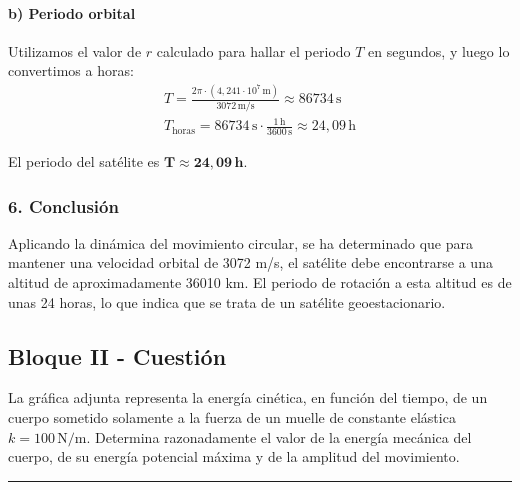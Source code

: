 \paragraph{b) Periodo orbital}
Utilizamos el valor de $r$ calculado para hallar el periodo $T$ en segundos, y luego lo convertimos a horas:
\begin{gather}
    T = \frac{2\pi \cdot (4,241 \cdot 10^7 \, \text{m})}{3072 \, \text{m/s}} \approx 86734 \, \text{s} \\
    T_{\text{horas}} = 86734 \, \text{s} \cdot \frac{1 \, \text{h}}{3600 \, \text{s}} \approx 24,09 \, \text{h}
\end{gather}
\begin{cajaresultado}
    El periodo del satélite es $\boldsymbol{T \approx 24,09 \, \textbf{h}}$.
\end{cajaresultado}

\subsubsection*{6. Conclusión}
\begin{cajaconclusion}
Aplicando la dinámica del movimiento circular, se ha determinado que para mantener una velocidad orbital de 3072 m/s, el satélite debe encontrarse a una altitud de aproximadamente 36010 km. El periodo de rotación a esta altitud es de unas 24 horas, lo que indica que se trata de un satélite geoestacionario.
\end{cajaconclusion}

\newpage
\subsection{Bloque II - Cuestión}
\label{subsec:II_A_2013_jun_ord}

\begin{cajaenunciado}
La gráfica adjunta representa la energía cinética, en función del tiempo, de un cuerpo sometido solamente a la fuerza de un muelle de constante elástica $k=100\,\text{N/m}$. Determina razonadamente el valor de la energía mecánica del cuerpo, de su energía potencial máxima y de la amplitud del movimiento.
\end{cajaenunciado}
\hrule

